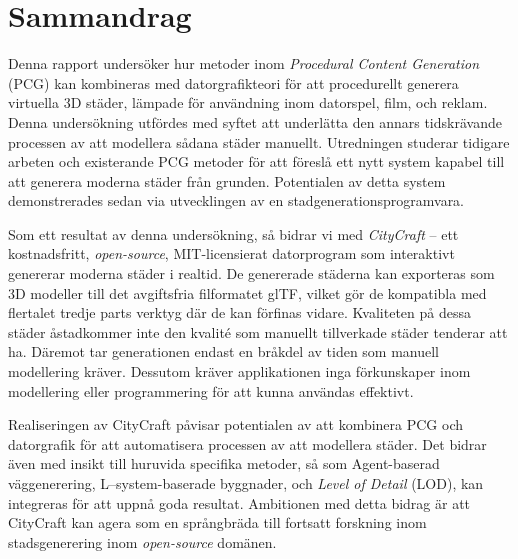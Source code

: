\chapter*{Sammandrag}

Denna rapport undersöker hur metoder inom \textit{Procedural Content Generation} (PCG) kan kombineras med datorgrafikteori för att procedurellt generera virtuella 3D städer, lämpade för användning inom datorspel, film, och reklam.
Denna undersökning utfördes med syftet att underlätta den annars tidskrävande processen av att modellera sådana städer manuellt.
Utredningen studerar tidigare arbeten och existerande PCG metoder för att föreslå ett nytt system kapabel till att generera moderna städer från grunden.
Potentialen av detta system demonstrerades sedan via utvecklingen av en stadgenerationsprogramvara.

Som ett resultat av denna undersökning, så bidrar vi med \textit{CityCraft} -- ett kostnadsfritt, \textit{open-source}, MIT-licensierat datorprogram som interaktivt genererar moderna städer i realtid.
De genererade städerna kan exporteras som 3D modeller till det avgiftsfria filformatet glTF, vilket gör de kompatibla med flertalet tredje parts verktyg där de kan förfinas vidare.
Kvaliteten på dessa städer åstadkommer inte den kvalité som manuellt tillverkade städer tenderar att ha.
Däremot tar generationen endast en bråkdel av tiden som manuell modellering kräver.
Dessutom kräver applikationen inga förkunskaper inom modellering eller programmering för att kunna användas effektivt.

Realiseringen av CityCraft påvisar potentialen av att kombinera PCG och datorgrafik för att automatisera processen av att modellera städer.
Det bidrar även med insikt till huruvida specifika metoder, så som Agent-baserad väggenerering, L--system-baserade byggnader, och \textit{Level of Detail} (LOD), kan integreras för att uppnå goda resultat.
Ambitionen med detta bidrag är att CityCraft kan agera som en språngbräda till fortsatt forskning inom stadsgenerering inom \textit{open-source} domänen.